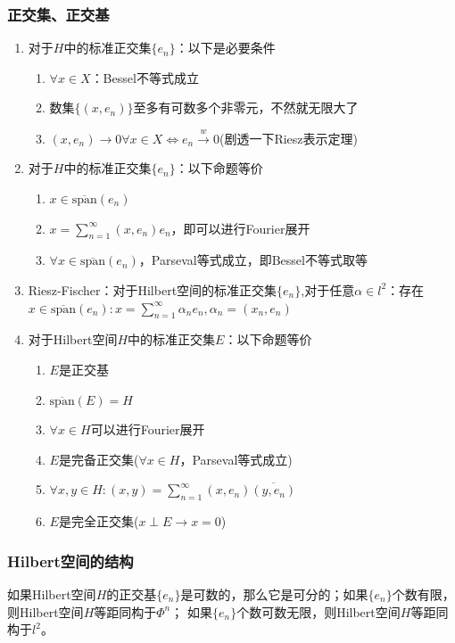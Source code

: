 \documentclass[a4paper, 12pt]{ctexart}
\begin{document}
\subsubsection{正交集、正交基}
\begin{enumerate}
    \item 对于$H$中的标准正交集$\{e_n\}$：以下是必要条件
    \begin{enumerate}
        \item $\forall x\in X$：Bessel不等式成立
        \item 数集$\{(x,e_n)\}$至多有可数多个非零元，不然就无限大了
        \item $(x,e_n)\to 0 \forall x\in X \iff e_n\overset{w}{\to}0$(剧透一下Riesz表示定理)
    \end{enumerate}
    \item 对于$H$中的标准正交集$\{e_n\}$：以下命题等价
    \begin{enumerate}
        \item $x\in \overline{\text{span}}(e_n)$
        \item $x=\sum_{n=1}^\infty  (x,e_n)e_n$，即可以进行Fourier展开
        \item $\forall x\in \overline{\text{span}}(e_n)$，Parseval等式成立，即Bessel不等式取等
    \end{enumerate}
    \item Riesz-Fischer：对于Hilbert空间的标准正交集$\{e_n\}$,对于任意$\alpha\in l^2$：存在 \\ $x\in \overline{\text{span}}(e_n):x=\sum_{n=1}^\infty \alpha_n e_n,\alpha_n=(x_n,e_n)$
    \item 对于Hilbert空间$H$中的标准正交集$E$：以下命题等价
    \begin{enumerate}
        \item $E$是正交基
        \item $\overline{\text{span}}(E)=H$
        \item $\forall x\in H$可以进行Fourier展开
        \item $E$是完备正交集($\forall x\in H$，Parseval等式成立)
        \item $\forall x,y\in H:(x,y)=\sum_{n=1}^\infty (x,e_n)\overline{(y,e_n)}$
        \item $E$是完全正交集($x \perp E \to x=0$)
    \end{enumerate}
\end{enumerate}

\subsubsection{Hilbert空间的结构}
如果Hilbert空间$H$的正交基$\{e_n\}$是可数的，那么它是可分的；如果$\{e_n\}$个数有限，则Hilbert空间$H$等距同构于$\Phi^n$；
如果$\{e_n\}$个数可数无限，则Hilbert空间$H$等距同构于$l^2$。
\end{document}
